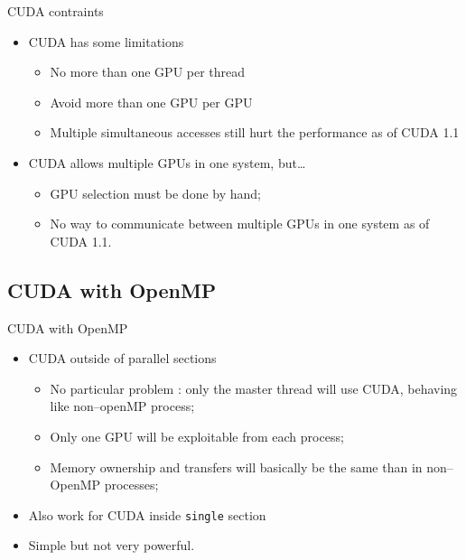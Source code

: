 \documentclass{beamer}
\begin{document}
\begin{frame}{CUDA contraints}

  \begin{itemize}
  \item CUDA has some limitations
    \begin{itemize}
    \item No more than one GPU per thread
    \item Avoid more than one GPU per GPU
    \item Multiple simultaneous accesses still hurt the performance
      as of CUDA 1.1
    \end{itemize}
  \item CUDA allows multiple GPUs in one system, but\ldots
    \begin{itemize}
    \item GPU selection must be done by hand;
    \item No way to communicate between multiple GPUs in
      one system as of CUDA 1.1.
    \end{itemize}
  \end{itemize}
\end{frame}

\subsection{CUDA with OpenMP}

\begin{frame}{CUDA with OpenMP}

  \begin{itemize}
  \item CUDA outside of parallel sections
    \begin{itemize}
    \item No particular problem : only the master thread will use
      CUDA, behaving like non--openMP process;
    \item Only one GPU will be exploitable from each process;
    \item Memory ownership and transfers will basically be the
      same than in non--OpenMP processes;
    \end{itemize}
  \item Also work for CUDA inside \texttt{single} section
  \item Simple but not very powerful.
  \end{itemize}
\end{frame}
\end{document}
